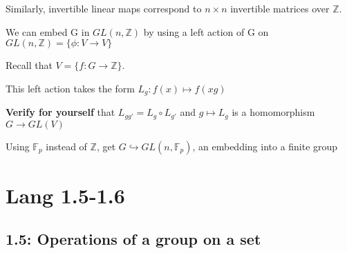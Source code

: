 \documentclass[12pt]{article}
\begin{document}
Similarly, invertible linear maps correspond to $n \times n$ invertible matrices over $\mathds{Z}$.

We can embed G in $GL(n, \mathds{Z})$ by using a left action of G on $GL(n, \mathds{Z}) = \{\phi: V \to V\}$

Recall that $V = \{f : G \to \mathds{Z}\}$.

This left action takes the form $L_g: f(x) \mapsto f(xg)$

\textbf{Verify for yourself} that $L_{gg'} = L_g \circ L_{g'}$ and $g \mapsto L_g$ is a homomorphism $G \to GL(V)$

Using $\mathds{F}_p$ instead of $\mathds{Z}$, get $G \hookrightarrow GL(n, \mathds{F}_p)$, an embedding into a finite group

\section{Lang 1.5-1.6}

\subsection{1.5: Operations of a group on a set}
\end{document}
